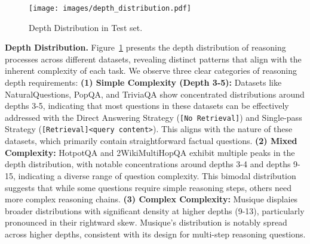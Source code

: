 
\begin{figure}[h]
    \centering
    \texttt{[image: images/depth\_distribution.pdf]}
    \caption{Depth Distribution in Test set.}
    \label{fig:depth_dist}
\end{figure}

\textbf{Depth Distribution.}
Figure~\ref{fig:depth_dist} presents the depth distribution of reasoning processes across different datasets, revealing distinct patterns that align with the inherent complexity of each task. We observe three clear categories of reasoning depth requirements:
\textbf{(1) Simple Complexity (Depth 3-5):} Datasets like NaturalQuestions, PopQA, and TriviaQA show concentrated distributions around depths 3-5, indicating that most questions in these datasets can be effectively addressed with the Direct Answering Strategy (\texttt{[No Retrieval]}) and Single-pass Strategy (\texttt{[Retrieval]<query content>}). 
This aligns with the nature of these datasets, which primarily contain straightforward factual questions.
\textbf{(2) Mixed Complexity:} HotpotQA and 2WikiMultiHopQA exhibit multiple peaks in the depth distribution, with notable concentrations around depths 3-4 and depths 9-15, indicating a diverse range of question complexity. This bimodal distribution suggests that while some questions require simple reasoning steps, others need more complex reasoning chains.
\textbf{(3) Complex Complexity:} Musique displaies broader distributions with significant density at higher depths (9-13), particularly pronounced in their rightward skew. 
Musique's distribution is notably spread across higher depths, consistent with its design for multi-step reasoning questions.

